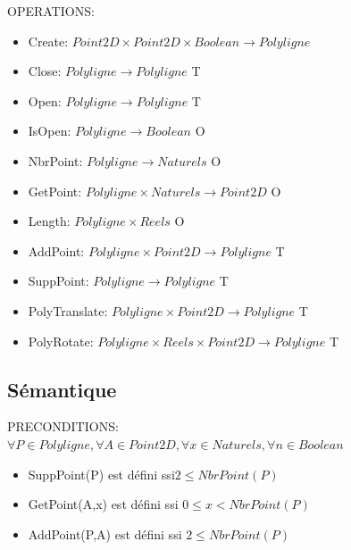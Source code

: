 \documentclass[a4paper, 11pt, oneside]{article}
\begin{document}
\noindent OPERATIONS: 
\begin{itemize}
    \item Create: $Point2D \times Point2D \times Boolean \xrightarrow{} Polyligne$ 
    \item Close: $Polyligne \xrightarrow{} Polyligne$ {\color{green} T}
    \item Open: $Polyligne \xrightarrow{} Polyligne$ {\color{green} T}
    \item IsOpen: $Polyligne \xrightarrow{} Boolean$ {\color{green} O}
    \item NbrPoint: $Polyligne \xrightarrow{} Naturels$ {\color{green} O}
    \item GetPoint: $Polyligne \times Naturels \xrightarrow{} Point2D$ {\color{green} O}
    \item Length: $Polyligne \times Reels$ {\color{green} O}
    \item AddPoint: $Polyligne \times Point2D \xrightarrow{} Polyligne${\color{green} T}
    \item SuppPoint: $Polyligne \xrightarrow{} Polyligne$ {\color{green} T}
    \item PolyTranslate: $Polyligne \times Point2D \xrightarrow{} Polyligne$ {\color{green} T}
    \item PolyRotate: $Polyligne \times Reels \times Point2D \xrightarrow{} Polyligne$ {\color{green} T}
\end{itemize}

\bigskip

\subsection{Sémantique}

\noindent PRECONDITIONS: $\forall P \in Polyligne, \forall A \in Point2D, \forall x \in Naturels, \forall n \in Boolean$
\begin{itemize}
    \item SuppPoint(P) est défini ssi$2 \leq  NbrPoint(P)$
    \item GetPoint(A,x) est défini ssi $0 \leq x < NbrPoint(P)$
    \item AddPoint(P,A) est défini ssi  $ 2 \leq  NbrPoint(P)$
\end{itemize}
\end{document}
